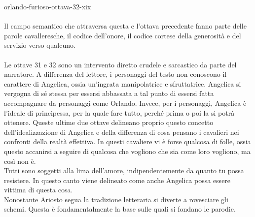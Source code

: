 \documentclass[preview]{standalone}
\begin{document}
\begin{snippet}{orlando-furioso-ottava-32-xix}
    \\\\
    Il campo semantico che attraversa questa e l'ottava precedente fanno
    parte delle parole cavalleresche, il codice dell'onore, il codice cortese
    della generosità e del servizio verso qualcuno.
    \\\\
    Le ottave 31 e 32 sono un intervento diretto crudele e sarcastico da parte del narratore.
    A differenza del lettore, i personaggi del testo non conoscono il carattere di Angelica,
    ossia un'ingrata manipolatrice e sfruttatrice.
    Angelica si vergogna di sé stessa per essersi abbassata a tal punto di essersi fatta accompagnare
    da personaggi come Orlando.
    Invece, per i personaggi, Angelica è l'ideale di principessa, per la quale fare tutto,
    perché prima o poi la si potrà ottenere.
    Queste ultime due ottave delineano proprio questo concetto dell'idealizzazione di Angelica
    e della differenza di cosa pensano i cavalieri nei confronti della realtà effettiva.
    In questi cavaliere vi è forse qualcosa di folle, ossia questo accanirsi a seguire di qualcosa
    che vogliono che sia come loro vogliono, ma così non è.
    \\
    Tutti sono soggetti alla lima dell'amore, indipendentemente da quanto tu possa resistere.
    In questo canto viene delineato come anche Angelica possa essere vittima di questa cosa.
    \\
    Nonostante Ariosto segua la tradizione letteraria si diverte a rovesciare gli schemi.
    Questa è fondamentalmente la base sulle quali si fondano le parodie.
\end{snippet}
\end{document}
